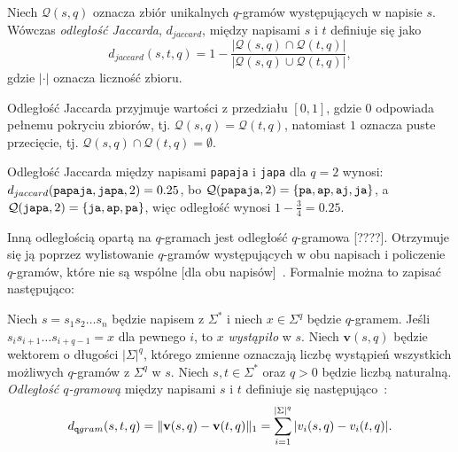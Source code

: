 \documentclass{praca1}
\DeclarePairedDelimiter{\norm}{\lVert}{\rVert}
\begin{document}
\begin{definition}
Niech $\mathcal{Q}(s,q)$ oznacza zbiór unikalnych $q$-gramów występujących w napisie $s$. Wówczas \emph{odległość Jaccarda}, $d_{jaccard}$, między napisami $s$ i $t$ definiuje się jako
\begin{equation*}
d_{jaccard}(s,t,q) = 1 - \frac{|\mathcal{Q}(s,q) \cap \mathcal{Q}(t,q)|}{|\mathcal{Q}(s,q) \cup \mathcal{Q}(t,q)|},
\end{equation*}
gdzie $|\cdot|$ oznacza liczność zbioru.
\end{definition} 

Odległość Jaccarda przyjmuje wartości z przedziału $[0,1]$, gdzie $0$ odpowiada pełnemu pokryciu zbiorów, tj. $\mathcal{Q}(s,q) = \mathcal{Q}(t,q)$, natomiast $1$ oznacza puste przecięcie, tj. $\mathcal{Q}(s,q) \cap \mathcal{Q}(t,q) = \emptyset$.

\begin{example}
Odległość Jaccarda między napisami \verb|papaja| i \verb|japa| dla $q = 2$ wynosi: $d_{jaccard}(\verb|papaja|, \verb|japa|, 2)  = 0.25$, bo $\mathcal{Q}(\verb|papaja|, 2) = \{\verb|pa|, \verb|ap|, \verb|aj|, \verb|ja|\}$, a $\mathcal{Q}(\verb|japa|, 2) = \{\verb|ja|, \verb|ap|, \verb|pa|\}$, więc odległość wynosi $1 - \frac{3}{4} = 0.25$.
\end{example}


Inną odległością opartą na $q$-gramach jest odległość $q$-gramowa [????]. Otrzymuje się ją poprzez wylistowanie $q$-gramów występujących w obu napisach i policzenie $q$-gramów, które nie są wspólne [dla obu napisów]~\cite{Loo2014:stringdist}. Formalnie można to zapisać następująco:

\begin{definition}
Niech $s = s_1 s_2 \ldots s_n$ będzie napisem z $\Sigma^*$ i niech $x \in \Sigma^q$ będzie $q$-gramem. Jeśli $s_i s_{i+1} \ldots s_{i+q-1} = x$ dla pewnego $i$, to $x$ \emph{wystąpiło} w $s$. Niech $\mathbf{v}(s,q)$ będzie wektorem o długości $|\Sigma|^q$, którego zmienne oznaczają liczbę wystąpień wszystkich możliwych $q$-gramów z $\Sigma^q$ w $s$. Niech $s, t \in \Sigma^*$ oraz $q>0$ będzie liczbą naturalną. \emph{Odległość $q$-gramową} między napisami $s$ i $t$ definiuje się następująco~\cite{Ukkonen1992:approxqgrams}:
\begin{equation}
\label{eq:009}
d_{\mathtt{q}gram}(s,t,q) = \norm{\mathbf{v}(s,q) - \mathbf{v}(t,q)}_1 = \sum\limits_{i = 1}^{|\Sigma|^q} |v_i(s,q) - v_i(t,q)|.
\end{equation}
\end{definition} 
\end{document}
